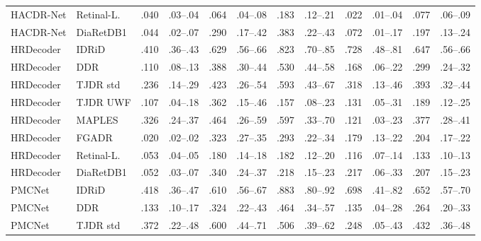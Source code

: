 \begin{landscape}
{\begin{longtable}{l l c c c c c c c c c c}
HACDR-Net & Retinal-L. & .040 & \scriptsize .03--.04 & .064 & \scriptsize .04--.08 & .183 & \scriptsize .12--.21 & .022 & \scriptsize .01--.04 & .077 & \scriptsize .06--.09 \\
HACDR-Net & DiaRetDB1 & .044 & \scriptsize .02--.07 & .290 & \scriptsize .17--.42 & .383 & \scriptsize .22--.43 & .072 & \scriptsize .01--.17 & .197 & \scriptsize .13--.24 \\
HRDecoder & IDRiD & .410 & \scriptsize .36--.43 & .629 & \scriptsize .56--.66 & .823 & \scriptsize .70--.85 & .728 & \scriptsize .48--.81 & .647 & \scriptsize .56--.66 \\
HRDecoder & DDR & .110 & \scriptsize .08--.13 & .388 & \scriptsize .30--.44 & .530 & \scriptsize .44--.58 & .168 & \scriptsize .06--.22 & .299 & \scriptsize .24--.32 \\
HRDecoder & TJDR std & .236 & \scriptsize .14--.29 & .423 & \scriptsize .26--.54 & .593 & \scriptsize .43--.67 & .318 & \scriptsize .13--.46 & .393 & \scriptsize .32--.44 \\
HRDecoder & TJDR UWF & .107 & \scriptsize .04--.18 & .362 & \scriptsize .15--.46 & .157 & \scriptsize .08--.23 & .131 & \scriptsize .05--.31 & .189 & \scriptsize .12--.25 \\
HRDecoder & MAPLES & .326 & \scriptsize .24--.37 & .464 & \scriptsize .26--.59 & .597 & \scriptsize .33--.70 & .121 & \scriptsize .03--.23 & .377 & \scriptsize .28--.41 \\
HRDecoder & FGADR & .020 & \scriptsize .02--.02 & .323 & \scriptsize .27--.35 & .293 & \scriptsize .22--.34 & .179 & \scriptsize .13--.22 & .204 & \scriptsize .17--.22 \\
HRDecoder & Retinal-L. & .053 & \scriptsize .04--.05 & .180 & \scriptsize .14--.18 & .182 & \scriptsize .12--.20 & .116 & \scriptsize .07--.14 & .133 & \scriptsize .10--.13 \\
HRDecoder & DiaRetDB1 & .052 & \scriptsize .03--.07 & .340 & \scriptsize .24--.37 & .218 & \scriptsize .15--.23 & .217 & \scriptsize .06--.33 & .207 & \scriptsize .15--.23 \\
PMCNet & IDRiD & .418 & \scriptsize .36--.47 & .610 & \scriptsize .56--.67 & .883 & \scriptsize .80--.92 & .698 & \scriptsize .41--.82 & .652 & \scriptsize .57--.70 \\
PMCNet & DDR & .133 & \scriptsize .10--.17 & .324 & \scriptsize .22--.43 & .464 & \scriptsize .34--.57 & .135 & \scriptsize .04--.28 & .264 & \scriptsize .20--.33 \\
PMCNet & TJDR std & .372 & \scriptsize .22--.48 & .600 & \scriptsize .44--.71 & .506 & \scriptsize .39--.62 & .248 & \scriptsize .05--.43 & .432 & \scriptsize .36--.48 \\

\end{longtable}}
\end{landscape}
